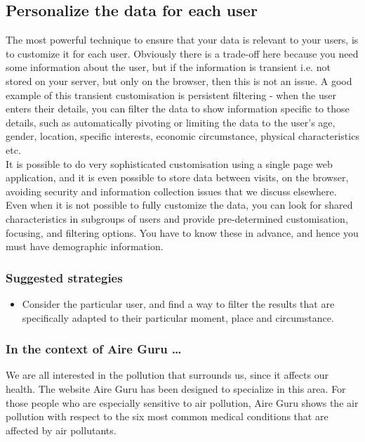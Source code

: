 \subsection{Personalize the data for each user}

The most powerful technique to ensure that your data is relevant to your users, is to customize it 
for each user. Obviously there is a trade-off here because you need some information about the user,
but if the information is transient i.e. not stored on your server, but only on the browser, then this
is not an issue. A good example of this transient customisation is persistent filtering - when the user enters
their details, you can filter the data to show information specific to those details,
such as automatically pivoting or limiting the data to the user's age, gender, location, specific interests, economic circumstance, physical characteristics etc.\\

It is possible to do very sophisticated customisation using a single page web application, and it is
even possible to store data between visits, on the browser, avoiding security and information collection issues that
we discuss elsewhere. \\

Even when it is not possible to fully customize the data, you can look for shared characteristics in subgroups of
users and provide pre-determined customisation, focusing, and filtering options.
You have to know these in advance, and hence you must have demographic information. \\

\subsubsection*{Suggested strategies} 

\begin{itemize}
  \item Consider the particular user, and find a way to filter the results that are specifically adapted to their particular moment, place and circumstance.
\end{itemize}

\subsubsection*{In the context of Aire Guru \ldots}

We are all interested in the pollution that surrounds us, since it affects our health. The website
Aire Guru has been designed to specialize in this area. For those people who are especially sensitive to air pollution,
Aire Guru shows the air pollution with respect to the six most common medical conditions that
are affected by air pollutants.\\
 
